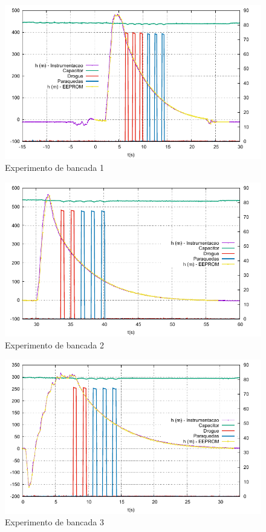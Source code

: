 \documentclass[12pt,a4paper]{article}
\begin{document}
\begin{figure}[!ht]
	\centering
	\includegraphics[width=\textwidth]{./data/exp-v1.5.5/exp01/fig}
	\caption{Experimento de bancada  1}
	\label{fig:exp01}
\end{figure}
\begin{figure}[!ht]
	\centering
	\includegraphics[width=\textwidth]{./data/exp-v1.5.5/exp02/fig}
	\caption{Experimento de bancada  2}
	\label{fig:exp02}
\end{figure}
\begin{figure}[!ht]
	\centering
	\includegraphics[width=\textwidth]{./data/exp-v1.5.5/exp03/fig}
	\caption{Experimento de bancada  3}
	\label{fig:exp03}
\end{figure}
\end{document}

